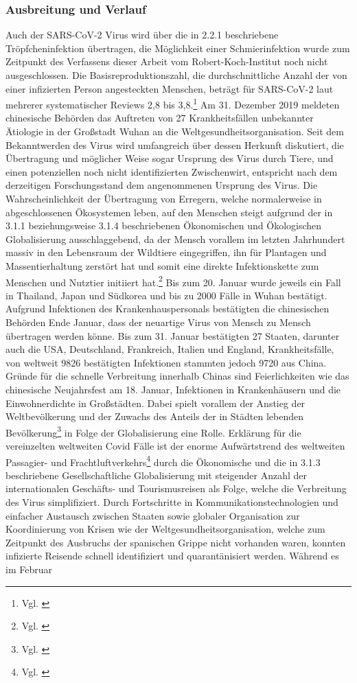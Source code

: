 \documentclass[12pt]{article}
\begin{document}
\subsubsection{Ausbreitung und Verlauf} \label{subsec:Cov-Ausbreitung}
Auch der SARS-CoV-2 Virus wird über die in 2.2.1 beschriebene Tröpfcheninfektion übertragen, die Möglichkeit einer Schmierinfektion wurde zum Zeitpunkt des Verfassens dieser Arbeit vom Robert-Koch-Institut noch nicht ausgeschlossen. Die Basisreproduktionszahl, die durchschnittliche Anzahl der von einer infizierten Person angesteckten Menschen, beträgt für SARS-CoV-2 laut mehrerer systematischer Reviews 2,8 bis 3,8.\footnote{Vgl. \cite{Rki21}} Am 31. Dezember 2019 meldeten chinesische Behörden das Auftreten von 27 Krankheitsfällen unbekannter Ätiologie in der Großstadt Wuhan an die Weltgesundheitsorganisation. Seit dem Bekanntwerden des Virus wird umfangreich über dessen Herkunft diskutiert, die Übertragung und möglicher Weise sogar Ursprung des Virus durch Tiere, und einen potenziellen noch nicht identifizierten Zwischenwirt, entspricht nach dem derzeitigen Forschungsstand dem angenommenen Ursprung des Virus. Die Wahrscheinlichkeit der Übertragung von Erregern, welche normalerweise in abgeschlossenen Ökosystemen leben, auf den Menschen steigt aufgrund der in 3.1.1 beziehungsweise 3.1.4 beschriebenen Ökonomischen und Ökologischen Globalisierung ausschlaggebend, da der Mensch vorallem im letzten Jahrhundert massiv in den Lebensraum der Wildtiere eingegriffen, ihn für Plantagen und Massentierhaltung zerstört hat und somit eine direkte Infektionskette zum Menschen und Nutztier initiiert hat.\footnote{Vgl. \cite{Schm21}}  Bis zum 20. Januar wurde jeweils ein Fall in Thailand, Japan und Südkorea und bis zu 2000 Fälle in Wuhan bestätigt. Aufgrund Infektionen des Krankenhauspersonals bestätigten die chinesischen Behörden Ende Januar, dass der neuartige Virus von Mensch zu Mensch übertragen werden könne. Bis zum 31. Januar bestätigten 27 Staaten, darunter auch die USA, Deutschland, Frankreich, Italien und England, Krankheitsfälle, von weltweit 9826 bestätigten Infektionen stammten jedoch 9720 aus China. Gründe für die schnelle Verbreitung innerhalb Chinas sind Feierlichkeiten wie das chinesische Neujahrsfest am 18. Januar, Infektionen in Krankenhäusern und die Einwohnerdichte in Großstädten. Dabei spielt vorallem der Anstieg der Weltbevölkerung und der Zuwachs des Anteils der in Städten lebenden Bevölkerung\footnote{Vgl. \cite{Städt22}} in Folge der Globalisierung eine Rolle. Erklärung für die vereinzelten weltweiten Covid Fälle ist der enorme Aufwärtstrend des weltweiten Passagier- und Frachtluftverkehrs\footnote{Vgl. \cite{Keller22}} durch die Ökonomische und die in 3.1.3 beschriebene Gesellschaftliche Globalisierung mit steigender Anzahl der internationalen Geschäfts- und Tourismusreisen als Folge, welche die Verbreitung des Virus simplifiziert. Durch Fortschritte in Kommunikationstechnologien und einfacher Austausch zwischen Staaten sowie globaler Organisation zur Koordinierung von Krisen wie der Weltgesundheitsorganisation, welche zum Zeitpunkt des Ausbruchs der spanischen Grippe nicht vorhanden waren, konnten infizierte Reisende schnell identifiziert und quarantänisiert werden. Während es im Februar 
\end{document}
